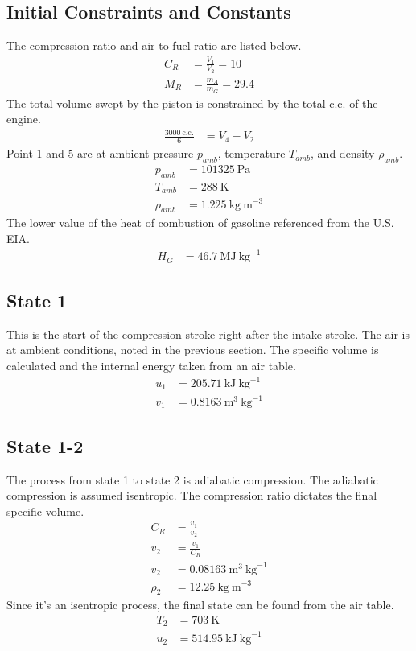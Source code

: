 \documentclass[10pt,a4paper]{article}
\begin{document}
	\subsection*{Initial Constraints and Constants}
	The compression ratio and air-to-fuel ratio are listed below.
	\begin{align}
		C_R &= \frac{V_1}{V_2} = 10 \\
		M_R &= \frac{m_A}{m_G} = 29.4
	\end{align}
	The total volume swept by the piston is constrained by the total c.c. of the engine.
	\begin{align}
		\frac{3000\ \text{c.c.}}{6} &= V_4-V_2 
	\end{align}
	Point 1 and 5 are at ambient pressure $p_{amb}$, temperature $T_{amb}$, and density $\rho_{amb}$.
	\begin{align}
		p_{amb} &= 101325\ \text{Pa} \\
		T_{amb} &= 288\ \text{K} \\
		\rho_{amb} &= 1.225\ \text{kg}\ \text{m}^{-3}
	\end{align}
	The lower value of the heat of combustion of gasoline referenced from the U.S. EIA.
	\begin{align}
		H_G &= 46.7\ \text{MJ}\ \text{kg}^{-1}
	\end{align}
	\subsection*{State 1}
	This is the start of the compression stroke right after the intake stroke. The air is at ambient conditions, noted in the previous section. The specific volume is calculated and the internal energy taken from an air table.
	\begin{align}
		u_1 &= 205.71\ \text{kJ}\ \text{kg}^{-1}\\
		v_1 &= 0.8163\ \text{m}^3\ \text{kg}^{-1}
	\end{align}
	
	\subsection*{State 1-2}
	The process from state 1 to state 2 is adiabatic compression. The adiabatic compression is assumed isentropic. The compression ratio dictates the final specific volume.
	\begin{align}
		C_R &= \frac{v_1}{v_2}\\
		v_2 &= \frac{v_1}{C_R}\\
		v_2 &= 0.08163\ \text{m}^3\ \text{kg}^{-1}\\
		\rho_2 &= 12.25\ \text{kg}\ \text{m}^{-3}
	\end{align}
	Since it's an isentropic process, the final state can be found from the air table.
	\begin{align}
		T_2 &= 703\ \text{K}\\
		u_2 &= 514.95\ \text{kJ}\ \text{kg}^{-1}
	\end{align}
\end{document}
